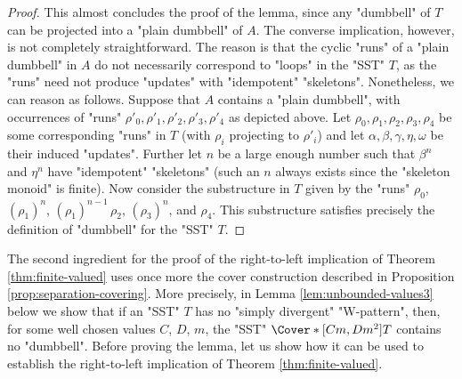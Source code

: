 \documentclass{theoretics}
\begin{document}
\begin{proof}
This almost concludes the proof of the lemma, since any "dumbbell" 
of $T$ can be projected into a "plain dumbbell" of $A$.
The converse implication, however, is not completely straightforward.
The reason is that the cyclic "runs" of a "plain dumbbell" in $A$
do not necessarily correspond to "loops" in the "SST" $T$, 
as the "runs" need not produce "updates" 
with "idempotent" "skeletons".
Nonetheless, we can reason as follows.
Suppose that $A$ contains a "plain dumbbell", 
with occurrences of "runs" $\rho'_0,\rho'_1,\rho'_2,\rho'_3,\rho'_4$ 
as depicted above.
Let $\rho_0,\rho_1,\rho_2,\rho_3,\rho_4$ be some
corresponding "runs" in $T$ (with $\rho_i$ projecting to $\rho'_i$) and let 
$\alpha,\beta,\gamma,\eta,\omega$ be their induced "updates".
Further let $n$ be a large enough number such that
$\beta^n$ and $\eta^n$ have "idempotent" "skeletons"
(such an $n$ always exists since the "skeleton monoid"
is finite).
Now consider the substructure in $T$ given by the "runs" 
$\rho_0$, %
$(\rho_1)^n$, %
$(\rho_1)^{n-1} \, \rho_2$, %
$(\rho_3)^n$, %
and
$\rho_4$. %
This substructure satisfies precisely the definition 
of "dumbbell" for the "SST" $T$.
\end{proof}

%



The second ingredient for the proof of the right-to-left 
implication of Theorem \ref{thm:finite-valued}
uses once more the cover construction 
described in Proposition \ref{prop:separation-covering}.
More precisely, in Lemma \ref{lem:unbounded-values3} below
we show that if an "SST" $T$ has no "simply divergent" "W-pattern", 
then, for some well chosen values $C$, $D$, $m$, 
the "SST" $\Cover*[Cm,Dm^2]{T}$ contains no "dumbbell".
Before proving the lemma, let us show how it can be used 
to establish the right-to-left implication of Theorem \ref{thm:finite-valued}.
\end{document}
